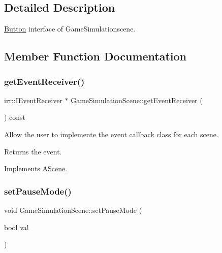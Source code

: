 \subsection{Detailed Description}
\hyperlink{classButton}{Button} interface of Game\+Simulationscene. 

\subsection{Member Function Documentation}
\mbox{\label{classGameSimulationScene_a048b2a937caff3af7b4d54f8bd404ec1}} 
\subsubsection{\texorpdfstring{get\+Event\+Receiver()}{getEventReceiver()}}
{\footnotesize\ttfamily irr\+::\+I\+Event\+Receiver $\ast$ Game\+Simulation\+Scene\+::get\+Event\+Receiver (\begin{DoxyParamCaption}{ }\end{DoxyParamCaption}) const\hspace{0.3cm}{\ttfamily [virtual]}}



Allow the user to implemente the event callback class for each scene. 

\begin{DoxyReturn}{Returns}
the event. 
\end{DoxyReturn}


Implements \hyperlink{classAScene_af521e5e6d30a5d2e5d30eb333e4d3abd}{A\+Scene}.

\mbox{\label{classGameSimulationScene_a34377bab69b7a81e50f3d2c42596c574}} 
\subsubsection{\texorpdfstring{set\+Pause\+Mode()}{setPauseMode()}}
{\footnotesize\ttfamily void Game\+Simulation\+Scene\+::set\+Pause\+Mode (\begin{DoxyParamCaption}\item[{bool}]{val }\end{DoxyParamCaption})\hspace{0.3cm}{\ttfamily [virtual]}}



